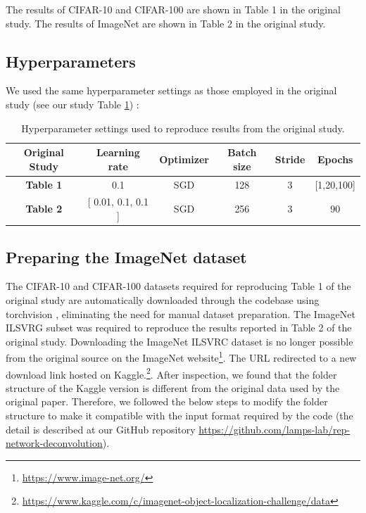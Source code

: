 The results of CIFAR-10 and CIFAR-100 are shown in Table 1 in the original study. The results of ImageNet are shown in Table 2 in the original study. 

\subsection{Hyperparameters}
We used the same hyperparameter settings as those employed in the original study (see our study Table \ref{tab:Hyperparameter-settings}) :

\begin{table}[htbp]
    \centering
    \caption{Hyperparameter settings used to reproduce results from the original study.}
    \begin{tabular}{cccccc}
    \toprule
         \textbf{Original Study} & \textbf{Learning rate}  & \textbf{Optimizer} & \textbf{Batch size} & \textbf{Stride} & \textbf{Epochs} \\
    \midrule
        \textbf{Table 1} & 0.1 & SGD & 128 & 3 & [1,20,100]\\
        \textbf{Table 2} & [ 0.01, 0.1, 0.1 ] & SGD & 256 & 3 & 90 \\
    \bottomrule
    \end{tabular}
    \label{tab:Hyperparameter-settings}
\end{table}





\subsection{Preparing the ImageNet dataset}\label{Preparing-the-ImageNet-dataset}

The CIFAR-10 and CIFAR-100 datasets required for reproducing Table 1 of the original study are automatically downloaded through the codebase using torchvision \cite{pytorchTorchvisiondatasetsx2014}, eliminating the need for manual dataset preparation. The ImageNet ILSVRG \cite{deng2009imagenet} subset was required to reproduce the results reported in Table 2 of the original study. Downloading the ImageNet ILSVRC dataset is no longer possible from the original source on the ImageNet website\footnote{\url{https://www.image-net.org/}}. The URL redirected to a new download link hosted on Kaggle.\footnote{\label{kaggle_}\url{https://www.kaggle.com/c/imagenet-object-localization-challenge/data}}. After inspection, we found that the folder structure of the Kaggle version is different from the original data used by the original paper. Therefore, we followed the below steps to modify the folder structure to make it compatible with the input format required by the code (the detail is described at our GitHub repository \url{https://github.com/lamps-lab/rep-network-deconvolution}).

